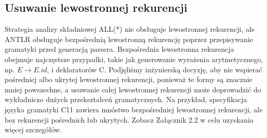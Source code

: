 \subsection{Usuwanie lewostronnej rekurencji}
Strategia analizy składniowej ALL(*) nie obsługuje lewostronnej rekurencji,
ale ANTLR obsługuje bezpośrednią lewostronną rekurencję poprzez przepisywanie
gramatyki przed generacją parsera.
Bezpośrednia lewostronna rekurencja obejmuje najczęstsze przypadki,
takie jak generowanie wyrażenia arytmetycznego,
np. $E \rightarrow E.id$, i deklaratorów C.
Podjęliśmy inżynierską decyzję, aby nie wspierać pośredniej albo ukrytej lewostronnej
rekurencji, ponieważ te formy są znacznie mniej powszechne,
a usuwanie całej lewostronnej rekurencji może doprowadzić do wykładniczo dużych
przekształceń gramatycznych.
Na przykład, specyfikacja języka gramatyki C11 zawiera mnóstwo bezpośredniej
lewostronnej rekurencji, ale bez rekurencji pośrednich lub ukrytych.
Zobacz Załącznik 2.2 w celu uzyskania więcej szczegółów.
